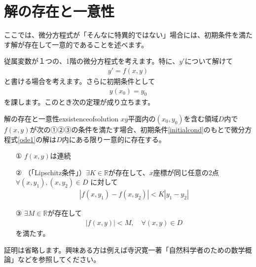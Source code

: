 \documentclass[report,paper=a4, fontsize=12pt, line_length=16cm, number_of_lines=33,dvipdfmx]{jlreq}
\numberwithin{equation}{section}
\newcommand{\Rb}{\mathbb{R}}
\begin{document}
\section{解の存在と一意性}\label{sec:exsistenceofsolution}
ここでは、微分方程式が「そんなに特異的ではない」場合には、初期条件を満たす解が存在して一意的であることを述べます。

従属変数が１つの、1階の微分方程式を考えます。特に、$y'$について解けて
\begin{align}
  y'=f(x,y)\label{ode1}
\end{align}
と書ける場合を考えます。さらに初期条件として
\begin{align}
  y(x_0)=y_0\label{initialcond}
\end{align}
を課します。このとき次の定理が成り立ちます。
\begin{theor}{解の存在と一意性}{exsistenceofsolution}
  $xy$平面内の$(x_0,y_0)$を含む領域$D$内で$f(x,y)$が次の①②③の条件を満たす場合、初期条件\eqref{initialcond}のもとで微分方程式\eqref{ode1}の解は$D$内にある限り一意的に存在する。
  \begin{itemize}
    \item[①] $f(x,y)$は連続
    \item[②] （「Lipschitz条件」）$\exists K\in \Rb$が存在して、$x$座標が同じ任意の2点$\forall (x,y_1),(x,y_2)\in D$ に対して
    \begin{align}
      |f(x,y_1)-f(x,y_2)|< K|y_1-y_2|
    \end{align}
    \item[③] $\exists M \in \Rb$が存在して
    \begin{align}
      |f(x,y)|<M,\quad \forall (x,y)\in D
    \end{align}
    を満たす。
  \end{itemize}
\end{theor}
証明は省略します。興味ある方は例えば寺沢寛一著「自然科学者のための数学概論」などを参照してください。
\end{document}
